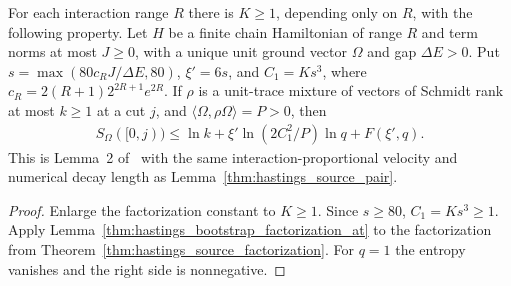 \begin{lemma}
    \label{thm:hastings_bootstrap_source}
    \leanok
    For each interaction range $R$ there is $K\ge1$, depending only on $R$,
    with the following property. Let $H$ be a finite chain Hamiltonian of
    range $R$ and term norms at most $J\ge0$, with a unique unit ground vector
    $\Omega$ and gap $\Delta E>0$. Put
    $s=\max(80c_RJ/\Delta E,80)$, $\xi'=6s$, and $C_1=Ks^3$,
    where $c_R=2(R+1)2^{2R+1}e^{2R}$.
    If $\rho$ is a unit-trace mixture of vectors of Schmidt rank at most
    $k\ge1$ at a cut $j$, and $\langle\Omega,\rho\Omega\rangle=P>0$, then
    \begin{align}
        S_\Omega([0,j))\le \ln k+\xi'\ln(2C_1^2/P)\ln q+F(\xi',q).
        \label{eq:hastings_bootstrap_source}
    \end{align}
    This is Lemma~2 of~\cite[lines 280--311]{Hastings2007AreaLaw}
    with the same interaction-proportional velocity and numerical decay
    length as Lemma~\ref{thm:hastings_source_pair}.
\end{lemma}
\begin{proof}\leanok
    Enlarge the factorization constant to $K\ge1$. Since $s\ge80$,
    $C_1=Ks^3\ge1$. Apply
    Lemma~\ref{thm:hastings_bootstrap_factorization_at} to the
    factorization from Theorem~\ref{thm:hastings_source_factorization}.
    For $q=1$ the entropy vanishes and the right side is nonnegative.
\end{proof}

